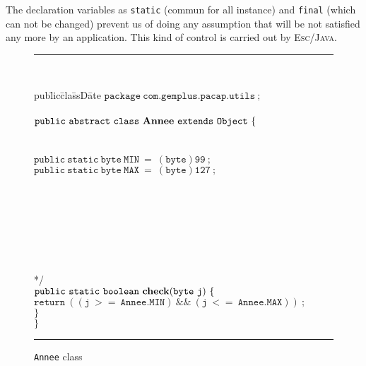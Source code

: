 \documentclass[a4paper]{llncs}
\begin{document}
The declaration variables as \texttt{static} (commun for all instance)
and \texttt{final} (which can not be changed) prevent us of doing
any assumption that will be not satisfied any more by an
application. This kind of control is carried out by
\textsc{Esc/Java}. \\


\begin{center}
\begin{figure}[htb]
\rule{\linewidth}{0.3mm}
\\[2.0ex]
\begin{tabbing}
pub\=lic\=cla\=ssD\=ate  \kill
$\mathtt{package\ com.gemplus.pacap.utils\ ;}$ \\
 \\
$\mathtt{public\ abstract\ class\ {\bf Annee}\ extends\ Object\ \{}$ \\
 \\
 \\ 
\>$\mathtt{public\ static\ byte\ MIN\ =\ (byte)99\ ;} $\\
\>$\mathtt{public\ static\ byte\ MAX\ =\ (byte)127\ ;} $\\
\\
\\
 \\
\> \\
\> \\
\> \\
\> \\
\>*/ \\
\>$\mathtt{public\ static\ boolean\ {\bf check}(byte\ j)\ \{} $ \\
\>\>$\mathtt{return\ ((j\ >=\ Annee.MIN)\ \&\&\ (j\ <=\ Annee.MAX))\ ;}$  \\
\>$\mathtt{\}} $ \\
$\mathtt{\}} $ \\
\end{tabbing}
\caption{{\tt Annee} class}
\label{fig-cla-ann}
\rule{\linewidth}{0.3mm}
\end{figure}
\end{center}
\end{document}

